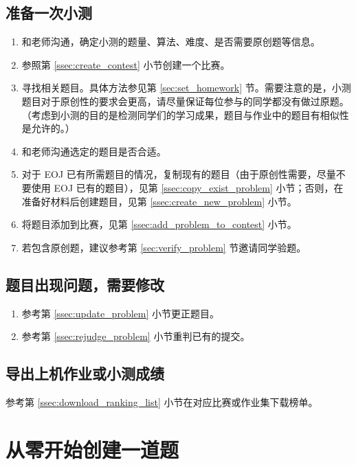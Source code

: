 \documentclass[oneside]{book}
\begin{document}
\section{准备一次小测}

\begin{enumerate}
  \item 和老师沟通，确定小测的题量、算法、难度、是否需要原创题等信息。
  \item 参照第 \ref{ssec:create_contest} 小节创建一个比赛。
  \item 寻找相关题目。具体方法参见第 \ref{sec:set_homework} 节。需要注意的是，小测题目对于原创性的要求会更高，请尽量保证每位参与的同学都没有做过原题。（考虑到小测的目的是检测同学们的学习成果，题目与作业中的题目有相似性是允许的。）
  \item 和老师沟通选定的题目是否合适。
  \item 对于 EOJ 已有所需题目的情况，复制现有的题目（由于原创性需要，尽量不要使用 EOJ 已有的题目），见第 \ref{ssec:copy_exist_problem} 小节；否则，在准备好材料后创建题目，见第 \ref{ssec:create_new_problem} 小节。
  \item 将题目添加到比赛，见第 \ref{ssec:add_problem_to_contest} 小节。
  \item 若包含原创题，建议参考第 \ref{sec:verify_problem} 节邀请同学验题。
\end{enumerate}

\section{题目出现问题，需要修改}

\begin{enumerate}
  \item 参考第 \ref{ssec:update_problem} 小节更正题目。
  \item 参考第 \ref{ssec:rejudge_problem} 小节重判已有的提交。
\end{enumerate}

\section{导出上机作业或小测成绩}

参考第 \ref{ssec:download_ranking_list} 小节在对应比赛或作业集下载榜单。

\chapter{从零开始创建一道题}

\label{chap:create_problem}
\end{document}
